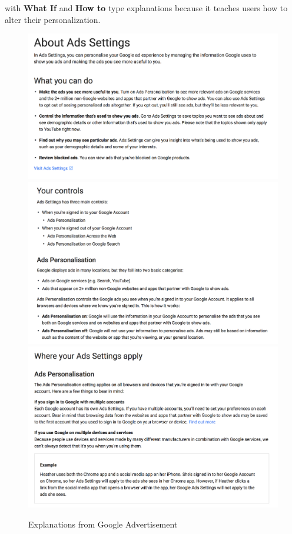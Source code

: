         with \textbf{What If} and \textbf{How to} type explanations because it teaches users how to alter their personalization.
        \begin{figure}[H]
            \centering
            \captionsetup{justification=centering}
            \begin{mdframed}
                \includegraphics[width=1\textwidth]{img/googleAd4-1}
                \includegraphics[width=1\textwidth]{img/googleAd4-2}
                \includegraphics[width=1\textwidth]{img/googleAd4-3}
            \end{mdframed}
            \caption{Explanations from Google Advertisement\cite{googleAd4}}
            \label{img:googleAd4}
        \end{figure}
